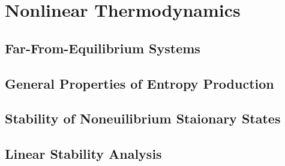 \chapter{Nonlinear Thermodynamics}
\section{Far-From-Equilibrium Systems}
\section{General Properties of Entropy Production}
\section{Stability of Noneuilibrium Staionary States}
\section{Linear Stability Analysis}
